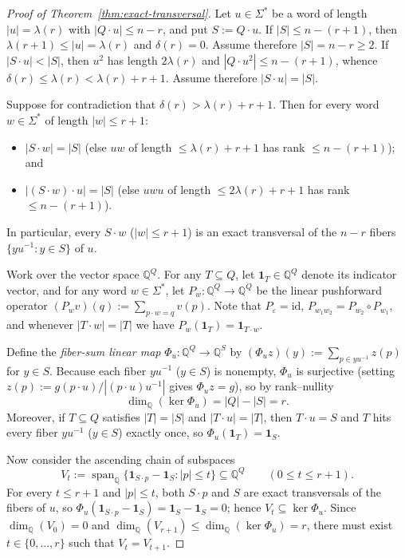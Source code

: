 \documentclass[11pt]{article}
\theoremstyle{definition}
\theoremstyle{remark}
\newcommand{\ind}{\mathbf{1}}
\newcommand{\Q}{\mathbb{Q}}
\begin{document}
\begin{proof}[Proof of Theorem~\ref{thm:exact-transversal}]
Let $u \in \Sigma^*$ be a word of length $|u| = \lambda(r)$ with $|Q \cdot u| \le n - r$, and put $S := Q \cdot u$. If $|S| \le n - (r + 1)$, then $\lambda(r + 1) \le |u| = \lambda(r)$ and $\delta(r) = 0$. Assume therefore $|S| = n - r \ge 2$. If $|S \cdot u| < |S|$, then $u^2$ has length $2\lambda(r)$ and $|Q \cdot u^2| \le n - (r + 1)$, whence $\delta(r) \le \lambda(r) < \lambda(r) + r + 1$. Assume therefore $|S \cdot u| = |S|$.

Suppose for contradiction that $\delta(r) > \lambda(r) + r + 1$. Then for every word $w \in \Sigma^*$ of length $|w| \le r + 1$:
\begin{itemize}[leftmargin=2em]
  \item $|S \cdot w| = |S|$ (else $u w$ of length $\le \lambda(r) + r + 1$ has rank $\le n - (r + 1)$); and
  \item $|(S \cdot w) \cdot u| = |S|$ (else $u w u$ of length $\le 2\lambda(r) + r + 1$ has rank $\le n - (r + 1)$).
\end{itemize}
In particular, every $S \cdot w$ ($|w| \le r + 1$) is an exact transversal of the $n - r$ fibers $\{y u^{-1} : y \in S\}$ of $u$.

Work over the vector space $\Q^Q$. For any $T \subseteq Q$, let $\ind_T \in \Q^Q$ denote its indicator vector, and for any word $w \in \Sigma^*$, let $P_w : \Q^Q \to \Q^Q$ be the linear pushforward operator $(P_w v)(q) := \sum_{p \cdot w = q} v(p)$. Note that $P_{\varepsilon} = \mathrm{id}$, $P_{w_1 w_2} = P_{w_2} \circ P_{w_1}$, and whenever $|T \cdot w| = |T|$ we have $P_w(\ind_T) = \ind_{T \cdot w}$.

Define the \emph{fiber-sum linear map} $\Phi_u : \Q^Q \to \Q^S$ by $(\Phi_u z)(y) := \sum_{p \in y u^{-1}} z(p)$ for $y \in S$. Because each fiber $y u^{-1}$ ($y \in S$) is nonempty, $\Phi_u$ is surjective (setting $z(p) := g(p \cdot u) / |(p \cdot u) u^{-1}|$ gives $\Phi_u z = g$), so by rank--nullity
\[
  \dim_\Q(\ker \Phi_u) = |Q| - |S| = r.
\]
Moreover, if $T \subseteq Q$ satisfies $|T| = |S|$ and $|T \cdot u| = |T|$, then $T \cdot u = S$ and $T$ hits every fiber $y u^{-1}$ ($y \in S$) exactly once, so $\Phi_u(\ind_T) = \ind_S$.

Now consider the ascending chain of subspaces
\[
  V_t := \operatorname{span}_\Q \bigl\{ \ind_{S \cdot p} - \ind_S : |p| \le t \bigr\} \subseteq \Q^Q \qquad (0 \le t \le r + 1).
\]
For every $t \le r + 1$ and $|p| \le t$, both $S \cdot p$ and $S$ are exact transversals of the fibers of $u$, so $\Phi_u(\ind_{S \cdot p} - \ind_S) = \ind_S - \ind_S = 0$; hence $V_t \subseteq \ker \Phi_u$. Since $\dim_\Q(V_0) = 0$ and $\dim_\Q(V_{r+1}) \le \dim_\Q(\ker \Phi_u) = r$, there must exist $t \in \{0, \dots, r\}$ such that $V_t = V_{t + 1}$.


\end{proof}
\end{document}
